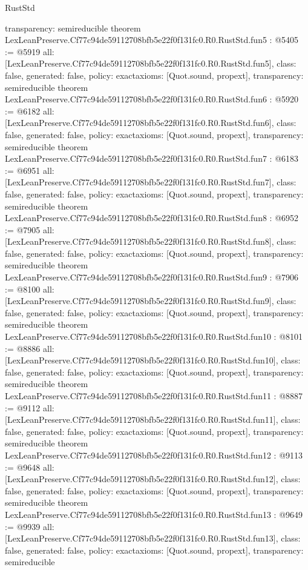 \begin{lexlean}{RustStd}
\begin{coremodule}
{  transparency: semireducible
}
theorem LexLeanPreserve.Cf77c94de59112708bfb5e22f0f131fc0.R0.RustStd.fun5 : @5405 := @5919 {
  all: [LexLeanPreserve.Cf77c94de59112708bfb5e22f0f131fc0.R0.RustStd.fun5],
  class: false,
  generated: false,
  policy: exact{axioms: [Quot.sound, propext]},
  transparency: semireducible
}
theorem LexLeanPreserve.Cf77c94de59112708bfb5e22f0f131fc0.R0.RustStd.fun6 : @5920 := @6182 {
  all: [LexLeanPreserve.Cf77c94de59112708bfb5e22f0f131fc0.R0.RustStd.fun6],
  class: false,
  generated: false,
  policy: exact{axioms: [Quot.sound, propext]},
  transparency: semireducible
}
theorem LexLeanPreserve.Cf77c94de59112708bfb5e22f0f131fc0.R0.RustStd.fun7 : @6183 := @6951 {
  all: [LexLeanPreserve.Cf77c94de59112708bfb5e22f0f131fc0.R0.RustStd.fun7],
  class: false,
  generated: false,
  policy: exact{axioms: [Quot.sound, propext]},
  transparency: semireducible
}
theorem LexLeanPreserve.Cf77c94de59112708bfb5e22f0f131fc0.R0.RustStd.fun8 : @6952 := @7905 {
  all: [LexLeanPreserve.Cf77c94de59112708bfb5e22f0f131fc0.R0.RustStd.fun8],
  class: false,
  generated: false,
  policy: exact{axioms: [Quot.sound, propext]},
  transparency: semireducible
}
theorem LexLeanPreserve.Cf77c94de59112708bfb5e22f0f131fc0.R0.RustStd.fun9 : @7906 := @8100 {
  all: [LexLeanPreserve.Cf77c94de59112708bfb5e22f0f131fc0.R0.RustStd.fun9],
  class: false,
  generated: false,
  policy: exact{axioms: [Quot.sound, propext]},
  transparency: semireducible
}
theorem LexLeanPreserve.Cf77c94de59112708bfb5e22f0f131fc0.R0.RustStd.fun10 : @8101 := @8886 {
  all: [LexLeanPreserve.Cf77c94de59112708bfb5e22f0f131fc0.R0.RustStd.fun10],
  class: false,
  generated: false,
  policy: exact{axioms: [Quot.sound, propext]},
  transparency: semireducible
}
theorem LexLeanPreserve.Cf77c94de59112708bfb5e22f0f131fc0.R0.RustStd.fun11 : @8887 := @9112 {
  all: [LexLeanPreserve.Cf77c94de59112708bfb5e22f0f131fc0.R0.RustStd.fun11],
  class: false,
  generated: false,
  policy: exact{axioms: [Quot.sound, propext]},
  transparency: semireducible
}
theorem LexLeanPreserve.Cf77c94de59112708bfb5e22f0f131fc0.R0.RustStd.fun12 : @9113 := @9648 {
  all: [LexLeanPreserve.Cf77c94de59112708bfb5e22f0f131fc0.R0.RustStd.fun12],
  class: false,
  generated: false,
  policy: exact{axioms: [Quot.sound, propext]},
  transparency: semireducible
}
theorem LexLeanPreserve.Cf77c94de59112708bfb5e22f0f131fc0.R0.RustStd.fun13 : @9649 := @9939 {
  all: [LexLeanPreserve.Cf77c94de59112708bfb5e22f0f131fc0.R0.RustStd.fun13],
  class: false,
  generated: false,
  policy: exact{axioms: [Quot.sound, propext]},
  transparency: semireducible
}
\end{coremodule}
\end{lexlean}
